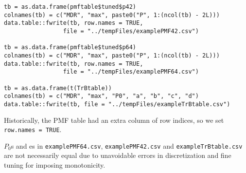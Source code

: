 \documentclass[12pt,letterpaper]{article}
\begin{document}
\begin{verbatim}
tb = as.data.frame(pmftable$tuned$p42)
colnames(tb) = c("MDR", "max", paste0("P", 1:(ncol(tb) - 2L)))
data.table::fwrite(tb, row.names = TRUE, 
                 file = "../tempFiles/examplePMF42.csv")

tb = as.data.frame(pmftable$tuned$p64)
colnames(tb) = c("MDR", "max", paste0("P", 1:(ncol(tb) - 2L)))
data.table::fwrite(tb, row.names = TRUE, 
                 file = "../tempFiles/examplePMF64.csv")

tb = as.data.frame(t(TrBtable))
colnames(tb) = c("MDR", "max", "P0", "a", "b", "c", "d")
data.table::fwrite(tb, file = "../tempFiles/exampleTrBtable.csv")
\end{verbatim}
Historically, the PMF table had an extra column of row indices, so we set \texttt{row.names = TRUE}. 

$P_0$s and es in  \texttt{examplePMF64.csv}, \texttt{examplePMF42.csv} and \texttt{exampleTrBtable.csv} are not necessarily equal due to unavoidable errors in discretization and fine tuning for imposing monotonicity.


%
%
%






	
\end{document}
